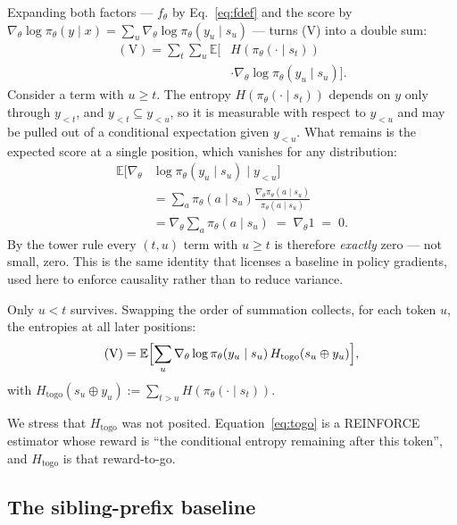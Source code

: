 \documentclass[11pt]{article}
\newcommand{\Htogo}{H_{\mathrm{togo}}}
\newcommand{\E}{\mathbb{E}}
\newcommand{\gradt}{\nabla_{\theta}}
\newcommand{\pit}{\pi_{\theta}}
\begin{document}
Expanding both factors --- $f_\theta$ by Eq.~\eqref{eq:fdef} and the score by
$\gradt \log \pit(y \mid x) = \sum_u \gradt \log \pit(y_u \mid s_u)$ --- turns (V)
into a double sum:
%
\begin{equation}
\begin{split}
(\mathrm{V}) = \sum_t \sum_u
\E\bigl[&H(\pit(\cdot \mid s_t))\\
&\cdot \gradt \log \pit(y_u \mid s_u)\bigr].
\end{split}
\label{eq:doublesum}
\end{equation}
%
Consider a term with $u \ge t$. The entropy $H(\pit(\cdot \mid s_t))$ depends on $y$
only through $y_{<t}$, and $y_{<t} \subseteq y_{<u}$, so it is measurable with
respect to $y_{<u}$ and may be pulled out of a conditional expectation given
$y_{<u}$. What remains is the expected score at a single position, which vanishes
for any distribution:
%
\begin{equation}
\begin{split}
\E\bigl[\gradt &\log \pit(y_u \mid s_u) \mid y_{<u}\bigr]\\
&= \sum_a \pit(a \mid s_u) \frac{\gradt \pit(a \mid s_u)}{\pit(a \mid s_u)}\\
&= \gradt \!\sum_a \pit(a \mid s_u)
\;=\; \gradt 1 \;=\; 0 .
\end{split}
\label{eq:scorezero}
\end{equation}
%
By the tower rule every $(t, u)$ term with $u \ge t$ is therefore \emph{exactly}
zero --- not small, zero. This is the same identity that licenses a baseline in
policy gradients, used here to enforce causality rather than to reduce variance.

Only $u < t$ survives. Swapping the order of summation collects, for each token
$u$, the entropies at all later positions:
%
\begin{equation}
(\mathrm{V}) = \E\Bigl[\sum_u \gradt \log \pit(y_u \mid s_u)\,
\Htogo(s_u \oplus y_u)\Bigr],
\label{eq:togo}
\end{equation}
%
with $\Htogo(s_u \oplus y_u) := \sum_{t > u} H(\pit(\cdot \mid s_t))$.

We stress that $\Htogo$ was not posited. Equation~\eqref{eq:togo} is a REINFORCE
estimator whose reward is ``the conditional entropy remaining after this token'',
and $\Htogo$ is that reward-to-go.

\subsection{The sibling-prefix baseline}
\end{document}
